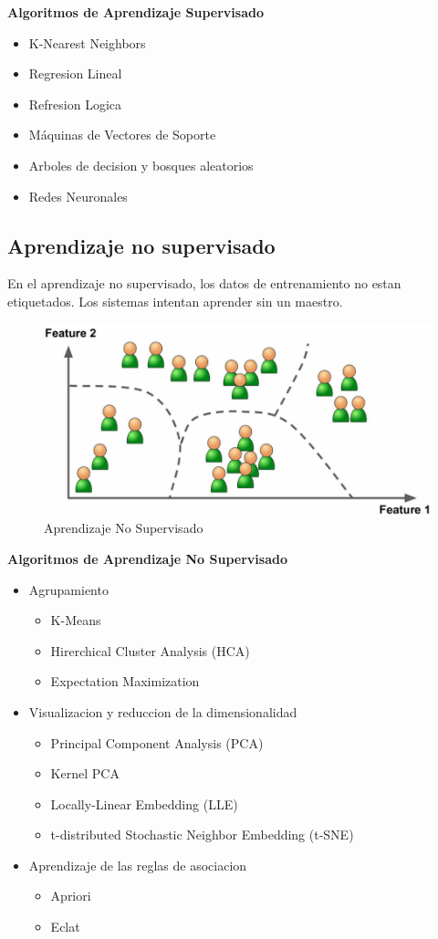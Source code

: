 \textbf{Algoritmos de Aprendizaje Supervisado}  \\
\begin{itemize}
    \item K-Nearest Neighbors
    
    \item Regresion Lineal
    
    \item Refresion Logica
    
    \item Máquinas de Vectores de Soporte
    
    \item Arboles de decision y bosques aleatorios
    
    \item Redes Neuronales
    
\end{itemize}

\subsection{Aprendizaje no supervisado}
En el aprendizaje no supervisado, los datos de entrenamiento no estan etiquetados. Los sistemas intentan aprender sin un maestro.

\begin{figure}[ht]
	\centering
	\includegraphics[width=0.30\linewidth]{figuras/clustering.png}
	\caption{Aprendizaje No Supervisado}
	\label{ANS}
\end{figure}

\textbf{Algoritmos de Aprendizaje No Supervisado} 

\begin{itemize}
    \item Agrupamiento
    	\begin{itemize}
    		\item K-Means
   			\item Hirerchical Cluster Analysis (HCA)
    		\item Expectation Maximization
		\end{itemize}
    \item Visualizacion y reduccion de la dimensionalidad
    	\begin{itemize}
    		\item Principal Component Analysis (PCA)
   			\item Kernel PCA
    		\item Locally-Linear Embedding (LLE)
    		\item t-distributed Stochastic Neighbor Embedding (t-SNE)
		\end{itemize}
    \item Aprendizaje de las reglas de asociacion
    	\begin{itemize}
    		\item Apriori
   			\item Eclat
		\end{itemize}
\end{itemize}

